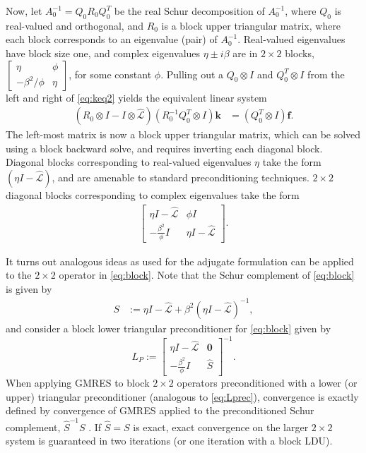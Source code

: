 \documentclass[review]{siamart}
\begin{document}
Now, let $A_0^{-1} = Q_0R_0Q_0^T$ be the real Schur decomposition of $A_0^{-1}$, where
$Q_0$ is real-valued and orthogonal, and $R_0$ is a block
upper triangular matrix, where each block corresponds to an eigenvalue (pair) of
$A_0^{-1}$. Real-valued eigenvalues have block size one, and complex eigenvalues
$\eta\pm i\beta$ are in $2\times 2$ blocks,
$\begin{bmatrix} \eta & \phi \\-\beta^2/\phi & \eta\end{bmatrix}$, for some
constant $\phi$.
Pulling out a $Q_0\otimes I$ and $Q_0^T\otimes I$ from the left and right of
\eqref{eq:keq2} yields the equivalent linear system
%
\begin{align}\label{eq:keq3}
\left( R_0\otimes I - I \otimes \widehat{\mathcal{L}}\right)
	(R_0^{-1}Q_0^T\otimes I) \mathbf{k} & = (Q_0^T\otimes I)\mathbf{f}.
\end{align}
%
The left-most matrix is now a block upper triangular matrix, which can be solved
using a block backward solve, and requires inverting each diagonal block. Diagonal
blocks corresponding to real-valued eigenvalues $\eta$ take the form
$(\eta I - \widehat{\mathcal{L}})$, and are amenable to standard preconditioning
techniques. $2\times 2$ diagonal blocks corresponding to complex eigenvalues
take the form
%
\begin{align}\label{eq:block}
\begin{bmatrix} \eta I - \widehat{\mathcal{L}} & \phi I\\
-\frac{\beta^2}{\phi} I & \eta I - \widehat{\mathcal{L}}\end{bmatrix}.
\end{align}
%

It turns out analogous ideas as used for the adjugate formulation can be applied
to the $2\times 2$ operator in \eqref{eq:block}. Note that the Schur complement
of \eqref{eq:block} is given by
%
\begin{align}\label{eq:simpSchur}
S & := \eta I - \widehat{\mathcal{L}} + \beta^2 (\eta I - \widehat{\mathcal{L}})^{-1},
\end{align}
%
and consider a block lower triangular preconditioner for \eqref{eq:block} given by
%
\begin{equation}\label{eq:Lprec}
L_P := \begin{bmatrix} \eta I - \widehat{\mathcal{L}} & \mathbf{0} \\ -\frac{\beta^2}{\phi} I
	& \widehat{S}\end{bmatrix}^{-1}.
\end{equation}
%
When applying GMRES to block $2\times 2$ operators preconditioned with a lower
(or upper) triangular preconditioner (analogous to \eqref{eq:Lprec}), convergence 
is exactly defined by convergence of GMRES applied to the preconditioned Schur
complement, $\widehat{S}^{-1}S$ \cite{2x2block}. If $\widehat{S} = S$ is exact,
exact convergence on the larger $2\times2$ system is guaranteed in two iterations
(or one iteration with a block LDU).
\end{document}
